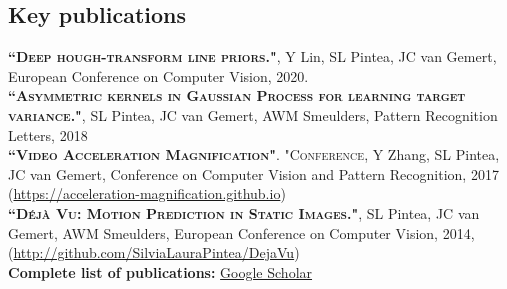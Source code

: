 \documentclass[a4paper, oneside, final]{scrartcl}
\begin{document}
\begin{center}
		\section{Key publications}
        \begin{flushleft}
			\textsc{\textbf{``Deep hough-transform line priors."}}, Y Lin, SL Pintea, JC van Gemert, European Conference on Computer Vision, 2020.\\[3px]
			\textsc{\textbf{``Asymmetric kernels in Gaussian Process for learning target variance."}}, SL Pintea, JC van Gemert, AWM Smeulders, 
            Pattern Recognition Letters, 2018\\[3px] 
			\textsc{\textbf{``Video Acceleration Magnification"}}. "\textsc{Conference}, Y Zhang, SL Pintea, JC van Gemert, 
            Conference on Computer Vision and Pattern Recognition, 2017 
            (\small\href{https://acceleration-magnification.github.io}{https://acceleration-magnification.github.io}) \\[3px]
            \textsc{\textbf{``D\'{e}j\`{a} Vu: Motion Prediction in Static Images."}}, SL Pintea, JC van Gemert, AWM Smeulders, 
            European Conference on Computer Vision, 2014, 
            (\small\href{http://github.com/SilviaLauraPintea/DejaVu}{http://github.com/SilviaLauraPintea/DejaVu})\\[10px]

            \textbf{Complete list of publications:} \href{https://scholar.google.nl/citations?user=shTkx9EAAAAJ&hl=en}{Google Scholar}\\
        \end{flushleft}

\end{center}
\end{document}
